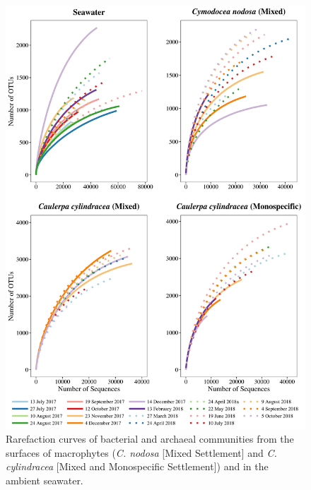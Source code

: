 \documentclass[12pt,]{article}
\begin{document}
\begin{figure}[H]

{\centering \includegraphics[width=0.85\linewidth]{../results/figures/rarefaction} 

}

\caption{Rarefaction curves of bacterial and archaeal communities from the surfaces of macrophytes (\textit{C. nodosa} [Mixed Settlement] and \textit{C. cylindracea} [Mixed and Monospecific Settlement]) and in the ambient seawater.\label{rarefaction}}\label{fig:unnamed-chunk-1}
\end{figure}
\end{document}
